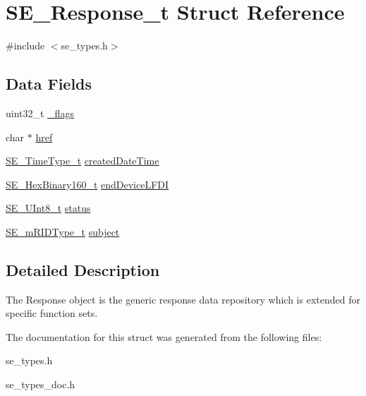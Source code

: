 \hypertarget{structSE__Response__t}{}\section{S\+E\+\_\+\+Response\+\_\+t Struct Reference}
\label{structSE__Response__t}


{\ttfamily \#include $<$se\+\_\+types.\+h$>$}

\subsection*{Data Fields}
\begin{DoxyCompactItemize}
\item 
uint32\+\_\+t \hyperlink{group__Response_ga23e952b1bb39c00c2b0686ef6d8ac02f}{\+\_\+flags}
\item 
char $\ast$ \hyperlink{group__Response_gad5bd6b0cc37466b254ddff1efd5cd74f}{href}
\item 
\hyperlink{group__TimeType_ga6fba87a5b57829b4ff3f0e7638156682}{S\+E\+\_\+\+Time\+Type\+\_\+t} \hyperlink{group__Response_ga45bb118c1fa5e91243ebcb39d47c5726}{created\+Date\+Time}
\item 
\hyperlink{group__HexBinary160_ga92b92aa55555bdb75f3a59060f2c1632}{S\+E\+\_\+\+Hex\+Binary160\+\_\+t} \hyperlink{group__Response_ga3b3495ba64ae18f96b7fb7c4f6c68d59}{end\+Device\+L\+F\+DI}
\item 
\hyperlink{group__UInt8_gaf7c365a1acfe204e3a67c16ed44572f5}{S\+E\+\_\+\+U\+Int8\+\_\+t} \hyperlink{group__Response_gac086b296f75d2f0ff0eecf0fd9271c75}{status}
\item 
\hyperlink{group__mRIDType_gac74622112f3a388a2851b2289963ba5e}{S\+E\+\_\+m\+R\+I\+D\+Type\+\_\+t} \hyperlink{group__Response_gac727cbc06cbfcea07b72fd18c0d1bf24}{subject}
\end{DoxyCompactItemize}


\subsection{Detailed Description}
The Response object is the generic response data repository which is extended for specific function sets. 

The documentation for this struct was generated from the following files\+:\begin{DoxyCompactItemize}
\item 
se\+\_\+types.\+h\item 
se\+\_\+types\+\_\+doc.\+h\end{DoxyCompactItemize}
